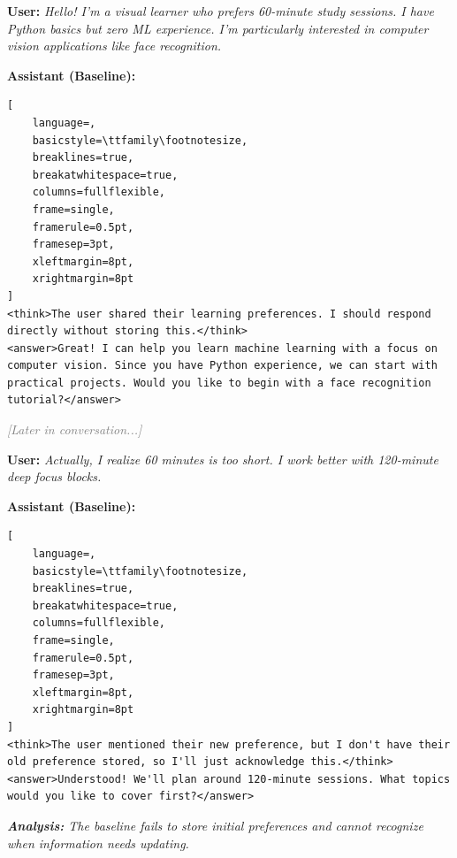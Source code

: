 \vspace{0.3cm}
\noindent\textbf{User:} \textit{Hello! I'm a visual learner who prefers 60-minute study sessions. I have Python basics but zero ML experience. I'm particularly interested in computer vision applications like face recognition.}

\vspace{0.2cm}
\noindent\textbf{Assistant (Baseline):}
\begin{footnotesize}
\begin{lstlisting}[
    language=,
    basicstyle=\ttfamily\footnotesize,
    breaklines=true,
    breakatwhitespace=true,
    columns=fullflexible,
    frame=single,
    framerule=0.5pt,
    framesep=3pt,
    xleftmargin=8pt,
    xrightmargin=8pt
]
<think>The user shared their learning preferences. I should respond directly without storing this.</think>
<answer>Great! I can help you learn machine learning with a focus on computer vision. Since you have Python experience, we can start with practical projects. Would you like to begin with a face recognition tutorial?</answer>
\end{lstlisting}
\end{footnotesize}

\vspace{0.25cm}
\noindent\textcolor{gray}{\textit{[Later in conversation...]}}

\vspace{0.2cm}
\noindent\textbf{User:} \textit{Actually, I realize 60 minutes is too short. I work better with 120-minute deep focus blocks.}

\vspace{0.2cm}
\noindent\textbf{Assistant (Baseline):}
\begin{footnotesize}
\begin{lstlisting}[
    language=,
    basicstyle=\ttfamily\footnotesize,
    breaklines=true,
    breakatwhitespace=true,
    columns=fullflexible,
    frame=single,
    framerule=0.5pt,
    framesep=3pt,
    xleftmargin=8pt,
    xrightmargin=8pt
]
<think>The user mentioned their new preference, but I don't have their old preference stored, so I'll just acknowledge this.</think>
<answer>Understood! We'll plan around 120-minute sessions. What topics would you like to cover first?</answer>
\end{lstlisting}
\end{footnotesize}

\vspace{0.25cm}
\noindent\textit{\textbf{Analysis:} The baseline fails to store initial preferences and cannot recognize when information needs updating.}

